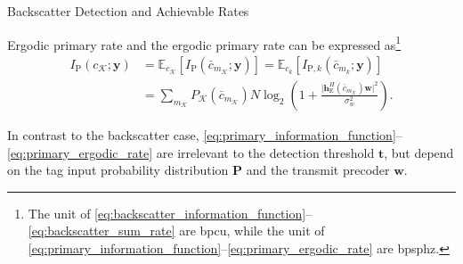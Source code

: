 \documentclass[journal]{IEEEtran}
\begin{document}
\begin{section}{Backscatter Detection and Achievable Rates}
\begin{subsection}{Ergodic primary rate}
			and the ergodic primary rate can be expressed as\footnote{The unit of \eqref{eq:backscatter_information_function}--\eqref{eq:backscatter_sum_rate} are \gls{bpcu}, while the unit of \eqref{eq:primary_information_function}--\eqref{eq:primary_ergodic_rate} are \gls{bpsphz}.}
			\begin{subequations}
				\begin{align}
					I_{\mathrm{P}}(c_{\mathcal{K}};\boldsymbol{y})
					& = \mathbb{E}_{c_{\mathcal{K}}} \left[I_{\mathrm{P}}(\bar{c}_{m_{\mathcal{K}}};\boldsymbol{y})\right] = \mathbb{E}_{c_k} \left[I_{\mathrm{P},k}(\bar{c}_{m_k};\boldsymbol{y})\right]\label{eq:primary_ergodic_rate_expectation}\\
					& = \sum_{m_{\mathcal{K}}} P_{\mathcal{K}}(\bar{c}_{m_{\mathcal{K}}}) N \log_2 \left(1 + \frac{\lvert \boldsymbol{h}_{\mathrm{E}}^H(\bar{c}_{m_{\mathcal{K}}}) \boldsymbol{w} \rvert^2}{\sigma_w^2}\right).
					\label{eq:primary_ergodic_rate_expansion}
				\end{align}
				\label{eq:primary_ergodic_rate}
			\end{subequations}

			In contrast to the backscatter case, \eqref{eq:primary_information_function}--\eqref{eq:primary_ergodic_rate} are irrelevant to the detection threshold $\boldsymbol{t}$, but depend on the tag input probability distribution $\boldsymbol{P}$ and the transmit precoder $\boldsymbol{w}$.
		\end{subsection}
	\end{section}
\end{document}
